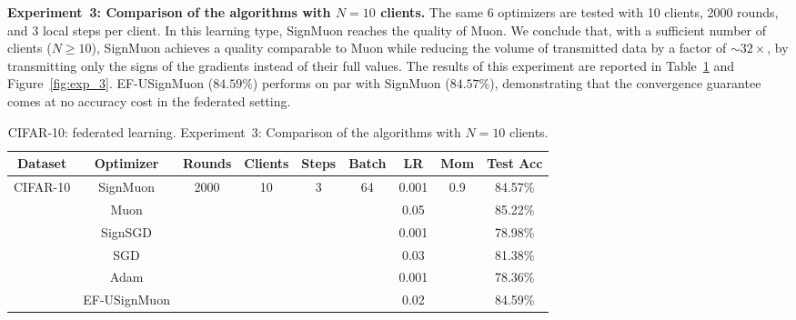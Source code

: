 \documentclass{article}
\begin{document}
\textbf{Experiment~3: Comparison of the algorithms with $N=10$ clients.} 
The same 6 optimizers are tested with 10 clients, 2000 rounds, and 3 local steps per client. In this learning type, SignMuon reaches the quality of Muon. We conclude that, with a sufficient number of clients ($N \ge 10$), SignMuon achieves a quality comparable to Muon while reducing the volume of transmitted data by a factor of ${\sim}32\times$, by transmitting only the signs of the gradients instead of their full values. The results of this experiment are reported in Table~\ref{tab:exp_3} and Figure~\ref{fig:exp_3}. EF-USignMuon ($84.59\%$) performs on par with SignMuon ($84.57\%$), demonstrating that the convergence guarantee comes at no accuracy cost in the federated setting.

\begin{table}[H]
\centering
\caption{CIFAR-10: federated learning. Experiment~3: Comparison of the algorithms with $N=10$ clients.}
\label{tab:exp_3}
\small
\renewcommand{\arraystretch}{1.2}
\begin{tabular}{|c|c|c|c|c|c|c|c|c|}
\hline
\textbf{Dataset} & \textbf{Optimizer} & \textbf{Rounds} & \textbf{Clients} & \textbf{Steps} & \textbf{Batch} & \textbf{LR} & \textbf{Mom} & \textbf{Test Acc} \\
\hline
\multirow{6}{*}{CIFAR-10} & SignMuon & \multirow{6}{*}{2000} & \multirow{6}{*}{10} & \multirow{6}{*}{3} & \multirow{6}{*}{64} & 0.001 & \multirow{6}{*}{0.9} & 84.57\% \\
\cline{2-2} \cline{7-7} \cline{9-9}
 & Muon & & & & & 0.05 & & 85.22\% \\
\cline{2-2} \cline{7-7} \cline{9-9}
 & SignSGD & & & & & 0.001 & & 78.98\% \\
\cline{2-2} \cline{7-7} \cline{9-9}
 & SGD & & & & & 0.03 & & 81.38\% \\
\cline{2-2} \cline{7-7} \cline{9-9}
 & Adam & & & & & 0.001 & & 78.36\% \\
\cline{2-2} \cline{7-7} \cline{9-9}
 & EF-USignMuon & & & & & 0.02 & & 84.59\% \\
\hline
\end{tabular}
\end{table}
\end{document}
